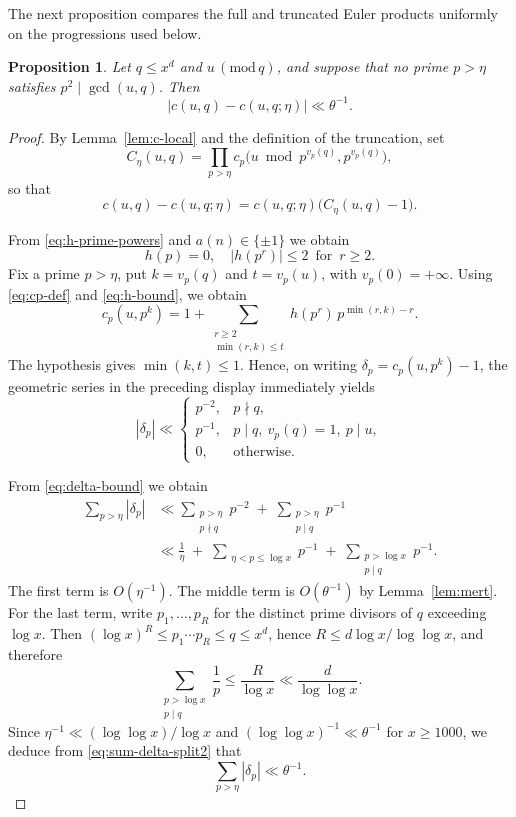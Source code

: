 \documentclass[12pt,reqno]{amsart}
\numberwithin{equation}{section}
\newtheorem{proposition}[theorem]{Proposition}
\theoremstyle{definition}
\renewcommand{\le}{\leqslant}
\renewcommand{\ge}{\geqslant}
\renewcommand{\pmod}[1]{\,(\mathrm{mod}\,#1)}
\begin{document}
The next proposition compares the full and truncated Euler products uniformly on the progressions used below.
\begin{proposition}\label{prop:diff}
Let $q\le x^d$ and $u\pmod q$, and suppose that no prime $p>\eta$ satisfies $p^2\mid\gcd(u,q)$.
Then
\[
|c(u,q)-c(u,q;\eta)|\ll\theta^{-1}.
\]
\end{proposition}
\begin{proof}
By Lemma~\ref{lem:c-local} and the definition of the truncation, set
\[
C_{\eta}(u,q)=\prod_{p>\eta}c_p\bigl(u\bmod p^{v_p(q)},p^{v_p(q)}\bigr),
\]
so that
\begin{equation}\label{eq:c-factor-tail}
c(u,q)-c(u,q; \eta)=c(u,q; \eta)\bigl(C_{\eta}(u,q)-1\bigr).
\end{equation}

From \eqref{eq:h-prime-powers} and $a(n)\in\{\pm1\}$ we obtain
\begin{equation}\label{eq:h-bound}
h(p)=0,\quad |h(p^r)|\le 2 \, \text{ for } \, r\ge 2.
\end{equation}
Fix a prime $p>\eta$, put $k=v_p(q)$ and $t=v_p(u)$, with $v_p(0)=+\infty$.
Using \eqref{eq:cp-def} and \eqref{eq:h-bound}, we obtain
\[
c_p(u,p^k)=1+\sum_{\substack{r\ge 2\\ \min(r,k)\le t}} h(p^r)\,p^{\min(r,k)-r}.
\]
The hypothesis gives $\min(k,t)\le1$.
Hence, on writing $\delta_p=c_p(u,p^k)-1$, the geometric series in the preceding display immediately yields
\begin{equation}\label{eq:delta-bound}
|\delta_p|
\ll
\begin{cases}
p^{-2}, & p\nmid q,\\
p^{-1}, & p\mid q,\ v_p(q)=1,\ p\mid u,\\
0, & \text{otherwise}.
\end{cases}
\end{equation}

From \eqref{eq:delta-bound} we obtain
\begin{align}
\nonumber \sum_{p>\eta}|\delta_p|
&\ll
\sum_{\substack{p>\eta\\ p\nmid q}} p^{-2}
\;+\;
\sum_{\substack{p>\eta\\ p\mid q}} p^{-1} \\
&\ll
\frac{1}{\eta}
\;+\;
\sum_{\substack{\eta<p\le \log x}} p^{-1}
\;+\;
\sum_{\substack{p>\log x\\ p\mid q}} p^{-1}. \label{eq:sum-delta-split2}
\end{align}
The first term is $O(\eta^{-1})$.
The middle term is $O(\theta^{-1})$ by Lemma~\ref{lem:mert}.
For the last term, write $p_1,\dots,p_R$ for the distinct prime divisors of $q$ exceeding $\log x$.
Then $(\log x)^R \le p_1\cdots p_R \le q \le x^d$, hence $R\le d\log x/\log\log x$, and therefore
\[
\sum_{\substack{p>\log x\\ p\mid q}} \frac1p \le \frac{R}{\log x}\ll \frac{d}{\log\log x}.
\]
Since $\eta^{-1}\ll (\log\log x)/\log x$ and $(\log\log x)^{-1}\ll \theta^{-1}$ for $x\ge 1000$, we deduce from \eqref{eq:sum-delta-split2} that
\begin{equation*}
\sum_{p>\eta}|\delta_p| \ll \theta^{-1}.
\end{equation*}


\end{proof}
\end{document}
